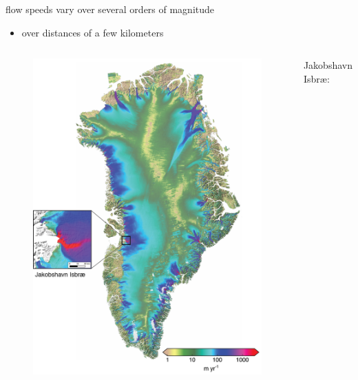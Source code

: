 \documentclass[hide notes,intlimits]{beamer}
\begin{document}
\begin{frame}[plain]

\phantom{foo}

flow speeds vary over several orders of magnitude

\begin{itemize}
\item over distances of a few kilometers
\end{itemize}

\vspace{-5mm}
  \begin{columns}
    \column[c]{5.5cm}
    \begin{figure}
      \includegraphics[width=\textwidth]{greenland-obs-overview}
    \end{figure}
    \column[c]{6cm}
    Jakobshavn Isbr{\ae}:
    

\end{columns}
\end{frame}
\end{document}
